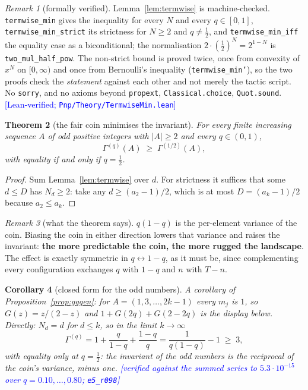 \documentclass[11pt,a4paper]{article}
\theoremstyle{plain}
\newtheorem{theorem}{Theorem}[section]
\newtheorem{corollary}[theorem]{Corollary}
\theoremstyle{definition}
\theoremstyle{remark}
\newtheorem{remark}[theorem]{Remark}
\newcommand{\Lean}[1]{\texttt{#1}}
\newcommand{\STATUS}[1]{\textcolor{blue}{\textsf{[#1]}}}
\begin{document}
\begin{remark}[formally verified]\label{rem:lean22}
Lemma~\ref{lem:termwise} is machine-checked. \Lean{termwise\_min} gives the inequality for
every $N$ and every $q\in[0,1]$, \Lean{termwise\_min\_strict} its strictness for $N\ge2$ and
$q\ne\tfrac12$, and \Lean{termwise\_min\_iff} the equality case as a biconditional; the
normalisation $2\cdot(\tfrac12)^N=2^{1-N}$ is \Lean{two\_mul\_half\_pow}. The non-strict
bound is proved twice, once from convexity of $x^N$ on $[0,\infty)$ and once from Bernoulli's
inequality (\Lean{termwise\_min'}), so the two proofs check the \emph{statement} against each
other and not merely the tactic script. No \texttt{sorry}, and no axioms beyond
\texttt{propext}, \texttt{Classical.choice}, \texttt{Quot.sound}.
\STATUS{Lean-verified; \texttt{Pnp/Theory/TermwiseMin.lean}}
\end{remark}

\begin{theorem}[the fair coin minimises the invariant]\label{thm:fair}
For every finite increasing sequence $A$ of odd positive integers with $|A|\ge2$ and every
$q\in(0,1)$,
\[
  \Gamma^{(q)}(A)\;\ge\;\Gamma^{(1/2)}(A),
\]
with equality if and only if $q=\tfrac12$.
\end{theorem}

\begin{proof}
Sum Lemma~\ref{lem:termwise} over $d$. For strictness it suffices that some $d\le D$ has
$N_d\ge2$: take any $d\ge(a_2-1)/2$, which is at most $D=(a_k-1)/2$ because $a_2\le a_k$.
\end{proof}

\begin{remark}[what the theorem says]\label{rem:physics}
$q(1-q)$ is the per-element variance of the coin. Biasing the coin in either direction
lowers that variance and raises the invariant: \textbf{the more predictable the coin, the more
rugged the landscape}. The effect is exactly symmetric in $q\leftrightarrow1-q$, as it must
be, since complementing every configuration exchanges $q$ with $1-q$ and $n$ with $T-n$.
\end{remark}

\begin{corollary}[closed form for the odd numbers]\label{cor:oddsclosed}
\emph{A corollary of Proposition~\ref{prop:gqgen}}: for $A=(1,3,\dots,2k-1)$ every $m_j$ is $1$,
so $G(z)=z/(2-z)$ and $1+G(2q)+G(2-2q)$ is the display below. Directly: $N_d=d$ for $d\le k$, so
in the limit $k\to\infty$
\[
  \Gamma^{(q)}=1+\frac{q}{1-q}+\frac{1-q}{q}=\frac{1}{q(1-q)}-1\;\ge\;3,
\]
with equality only at $q=\tfrac12$: \emph{the invariant of the odd numbers is the reciprocal
of the coin's variance, minus one}. \STATUS{verified against the summed series to
$5.3\cdot10^{-15}$ over $q=0.10,\dots,0.80$; \texttt{e5\_r098}}
\end{corollary}
\end{document}

